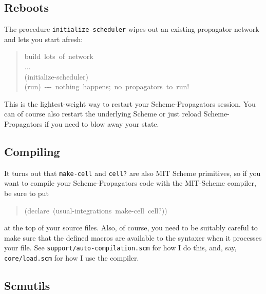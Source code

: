 \documentclass[12pt,letterpaper,english]{article}
\begin{document}

\hypertarget{reboots}{}
\subsection{Reboots}
\label{reboots}

The procedure \texttt{initialize-scheduler} wipes out an existing
propagator network and lets you start afresh:
\begin{quote}{\ttfamily \raggedright \noindent
build~lots~of~network~\\
...~\\
(initialize-scheduler)~\\
(run)~-{}-{}-~nothing~happens;~no~propagators~to~run!
}\end{quote}

This is the lightest-weight way to restart your Scheme-Propagators
session.  You can of course also restart the underlying Scheme or just
reload Scheme-Propagators if you need to blow away your state.



\hypertarget{compiling}{}
\subsection{Compiling}
\label{compiling}

It turns out that \texttt{make-cell} and \texttt{cell?} are also MIT Scheme
primitives, so if you want to compile your Scheme-Propagators
code with the MIT-Scheme compiler, be sure to put
\begin{quote}{\ttfamily \raggedright \noindent
(declare~(usual-integrations~make-cell~cell?))
}\end{quote}
at the top of your source files.  Also, of course, you need to be
suitably careful to make sure that the defined macros are available to
the syntaxer when it processes your file.  See
\texttt{support/auto-compilation.scm} for how I do this, and, say,
\texttt{core/load.scm} for how I use the compiler.



\hypertarget{scmutils}{}
\subsection{Scmutils}
\label{scmutils}
\end{document}
